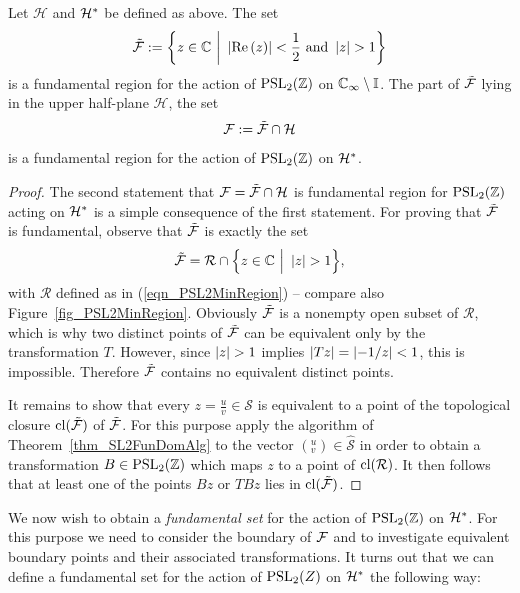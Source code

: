 \begin{theorem}
\label{thm_PSL2FunDom}
Let $\mathcal{H}$ and $\mathcal{H}^\ast$ be defined as above. The set
\begin{equation}
\tilde{\mathcal{F}} := \bigg\{ z \in \mathbb{C} \ \bigg| \ \left|\operatorname{Re}\left(z\right)\right| < \frac{1}{2} \text{ and } \left|z\right| > 1 \bigg\}
\end{equation}
is a fundamental region for the action of $\operatorname{PSL}_{2}(\mathbb{Z})$ on $\mathbb{C}_{\infty} \setminus \mathbb{I}$. The part of $\tilde{\mathcal{F}}$ lying in the upper half-plane $\mathcal{H}$, \ie the set
\begin{equation}
\label{eqn_PSL2FunDom}
\mathcal{F} := \tilde{\mathcal{F}} \cap \mathcal{H}
\end{equation}
is a fundamental region for the action of $\operatorname{PSL}_{2}(\mathbb{Z})$ on $\mathcal{H}^\ast$.
\end{theorem}
\begin{proof}
The second statement that $\mathcal{F} = \tilde{\mathcal{F}} \cap \mathcal{H}$ is fundamental region for $\operatorname{PSL}_{2}(\mathbb{Z})$ acting on $\mathcal{H}^\ast$ is a simple consequence of the first statement. For proving that $\tilde{\mathcal{F}}$ is fundamental,  observe that $\tilde{\mathcal{F}}$ is exactly the set
\begin{equation*}
\tilde{\mathcal{F}} = \mathcal{R} \cap \Big\{ z \in \mathbb{C} \ \Big| \ \left|z\right| > 1 \Big\},
\end{equation*}
with $\mathcal{R}$ defined as in (\ref{eqn_PSL2MinRegion}) -- compare also Figure~\ref{fig_PSL2MinRegion}. Obviously $\tilde{\mathcal{F}}$ is a nonempty open subset of $\mathcal{R}$, which is why two distinct points of $\tilde{\mathcal{F}}$ can be equivalent only by the transformation $T$. However, since $\left|z\right| > 1$ implies $\left|Tz\right| = \left|-1/z\right| < 1$, this is impossible. Therefore $\tilde{\mathcal{F}}$ contains no equivalent distinct points.

It remains to show that every $z = \frac{u}{v} \in \mathcal{S}$ is equivalent to a point of the topological closure $\operatorname{cl}(\tilde{\mathcal{F}})$ of $\tilde{\mathcal{F}}$. For this purpose apply the algorithm of Theorem~\ref{thm_SL2FunDomAlg} to the vector $({}^u_v) \in \hat{\mathcal{S}}$ in order to obtain a transformation $B \in \operatorname{PSL}_{2}(\mathbb{Z})$ which maps $z$ to a point of $\operatorname{cl}(\mathcal{R})$. It then follows that at least one of the points $Bz$ or $TBz$ lies in $\operatorname{cl}(\tilde{\mathcal{F}})$.
\end{proof}

We now wish to obtain a \emph{fundamental set} for the action of $\operatorname{PSL}_{2}(\mathbb{Z})$ on $\mathcal{H}^\ast$. For this purpose we need to consider the boundary of $\mathcal{F}$ and to investigate equivalent boundary points and their associated transformations. It turns out that we can define a fundamental set for the action of $\operatorname{PSL}_{2}(Z)$ on $\mathcal{H}^\ast$ the following way:

